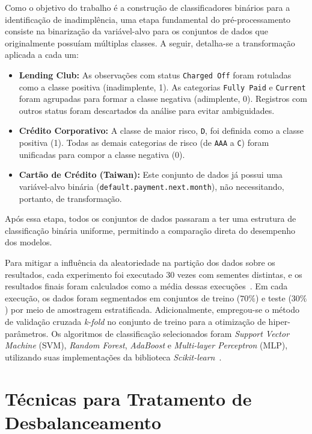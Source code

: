 Como o objetivo do trabalho é a construção de classificadores binários para a identificação de inadimplência, uma etapa fundamental do pré-processamento consiste na binarização da variável-alvo para os conjuntos de dados que originalmente possuíam múltiplas classes. A seguir, detalha-se a transformação aplicada a cada um:
\begin{itemize}
  \item \textbf{Lending Club:} As observações com status \texttt{Charged Off} foram rotuladas como a classe positiva (inadimplente, 1). As categorias \texttt{Fully Paid} e \texttt{Current} foram agrupadas para formar a classe negativa (adimplente, 0). Registros com outros status foram descartados da análise para evitar ambiguidades.
  \item \textbf{Crédito Corporativo:} A classe de maior risco, \texttt{D}, foi definida como a classe positiva (1). Todas as demais categorias de risco (de \texttt{AAA} a \texttt{C}) foram unificadas para compor a classe negativa (0).
  \item \textbf{Cartão de Crédito (Taiwan):} Este conjunto de dados já possui uma variável-alvo binária (\texttt{default.payment.next.month}), não necessitando, portanto, de transformação.
\end{itemize}
Após essa etapa, todos os conjuntos de dados passaram a ter uma estrutura de classificação binária uniforme, permitindo a comparação direta do desempenho dos modelos.

Para mitigar a influência da aleatoriedade na partição dos dados sobre os resultados, cada experimento foi executado \(30\) vezes com sementes distintas, e os resultados finais foram calculados como a média dessas execuções~\cite{Namvar2018}. Em cada execução, os dados foram segmentados em conjuntos de treino (\(70\%\)) e teste (\(30\%\)) por meio de amostragem estratificada. Adicionalmente, empregou-se o método de validação cruzada \textit{k-fold} no conjunto de treino para a otimização de hiper-parâmetros. Os algoritmos de classificação selecionados foram \textit{Support Vector Machine} (SVM), \textit{Random Forest}, \textit{AdaBoost} e \textit{Multi-layer Perceptron} (MLP), utilizando suas implementações da biblioteca \textit{Scikit-learn}~\cite{Pedregosa2011scikit}.

\section{Técnicas para Tratamento de Desbalanceamento}\label{sec:tecnicas}

